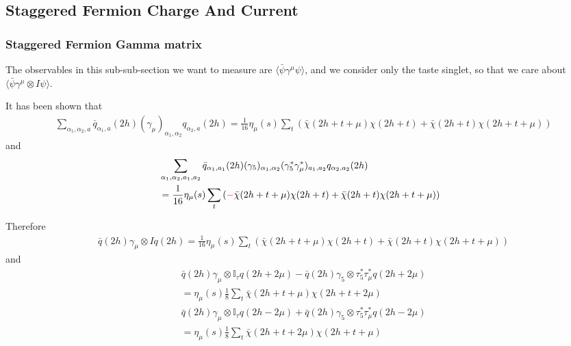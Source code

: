 \subsection{\label{StaggeredFermionSpectrumChargeAndCurrent}Staggered Fermion Charge And Current}

\subsubsection{\label{StaggeredFermionGammaMatrix}Staggered Fermion Gamma matrix}

The observables in this sub-sub-section we want to measure are $\langle \bar{\psi} \gamma ^{\mu} \psi \rangle$, and we consider only the taste singlet, so that we care about $\langle \bar{\psi} \gamma ^{\mu}\otimes I \psi \rangle$.

It has been shown that
\textcolor[rgb]{0,0.5,0}{
\begin{equation}
\begin{split}
&\sum _{\alpha_1,\alpha _2,a} \bar{q}_{\alpha_1,a}(2h)(\gamma _{\mu})_{\alpha_1,\alpha_2} q_{\alpha _2,a}(2h) = \frac{1}{16} \eta _{\mu}(s)\sum _{t} \left(\bar{\chi}(2h+t+\mu)\chi (2h+t) +  \bar{\chi}(2h+t)\chi (2h+t+\mu)\right)
\end{split}
\end{equation}
and
\begin{equation}
\begin{split}
&\sum _{\alpha_1,\alpha _2,a_1,a_2} \bar{q}_{\alpha_1,a_1}(2h)(\gamma _5)_{\alpha_1,\alpha_2} (\gamma _5^*\gamma _{\mu}^*)_{a_1,a_2}q_{\alpha _2,a_2}(2h) \\
&= \frac{1}{16} \eta _{\mu}(s)\sum _{t} \left(\textcolor[rgb]{1,0,0}{-}\bar{\chi}(2h+t+\mu)\chi (2h+t) +  \bar{\chi}(2h+t)\chi (2h+t+\mu)\right)
\end{split}
\end{equation}}

Therefore
\textcolor[rgb]{0,0,1}{
\begin{equation}
\begin{split}
&\bar{q}(2h)\gamma _{\mu}\otimes I q(2h) = \frac{1}{16} \eta _{\mu}(s)\sum _{t} \left(\bar{\chi}(2h+t+\mu)\chi (2h+t) +  \bar{\chi}(2h+t)\chi (2h+t+\mu)\right)
\end{split}
\end{equation}
and
\begin{equation}
\begin{split}
&\bar{q}(2h)\gamma _{\mu}\otimes \mathbb{I}_{\tau} q(2h+2\mu) - \bar{q}(2h)\gamma _5\otimes \tau _5^*\tau _{\mu}^* q(2h+2\mu)\\
&=\eta _{\mu}(s)\frac{1}{8}\sum _{t} \bar{\chi}(2h+t+\mu)\chi (2h+t+2\mu)\\
&\bar{q}(2h)\gamma _{\mu}\otimes \mathbb{I}_{\tau} q(2h-2\mu) + \bar{q}(2h)\gamma _5\otimes \tau _5^*\tau _{\mu}^* q(2h-2\mu)\\
&=\eta _{\mu}(s)\frac{1}{8}\sum _{t} \bar{\chi}(2h+t+2\mu)\chi (2h+t+\mu)\\
\end{split}
\end{equation}}

